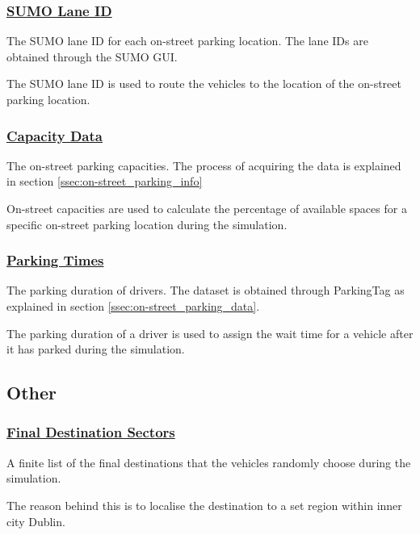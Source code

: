 \subsubsection{\underline{\ac{SUMO} Lane ID}}
\begin{description}[leftmargin=8em,style=nextline]
  \item[Explanation] The \ac{SUMO} lane ID for each on-street parking location. The lane IDs are obtained through the \ac{SUMO} GUI. 
  \item[Purpose] The \ac{SUMO} lane ID is used to route the vehicles to the location of the on-street parking location.
\end{description}

\subsubsection{\underline{Capacity Data}}
\begin{description}[leftmargin=8em,style=nextline]
  \item[Explanation] The on-street parking capacities. The process of acquiring the data is explained in section \ref{ssec:on-street_parking_info}
  \item[Purpose] On-street capacities are used to calculate the percentage of available spaces for a specific on-street parking location during the simulation.
\end{description}

\subsubsection{\underline{Parking Times}}
\begin{description}[leftmargin=8em,style=nextline]
  \item[Explanation] The parking duration of drivers. The dataset is obtained through ParkingTag as explained in section \ref{ssec:on-street_parking_data}.
  \item[Purpose] The parking duration of a driver is used to assign the wait time for a vehicle after it has parked during the simulation.
\end{description}


\subsection{Other}
\subsubsection{\underline{Final Destination Sectors}}
\begin{description}[leftmargin=8em,style=nextline]
  \item[Explanation] A finite list of the final destinations that the vehicles randomly choose during the simulation.
  \item[Purpose] The reason behind this is to localise the destination to a set region within inner city Dublin.
\end{description}

